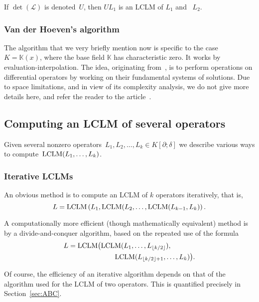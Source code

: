 \documentclass{sig-alt-full}
\def\K {\ensuremath{\mathbb{K}}}
\newcommand{\pa} { \partial}
\newcommand{\lclm} { {\rm LCLM}}
\begin{document}
\noindent If $\det(\mathcal{L})$ is denoted~$U$, then  $UL_1$ is an LCLM of $L_1$ and ~$L_2$.

\subsubsection{Van der Hoeven's algorithm}
The algorithm that we very briefly mention now is specific to the case $K =
\K(x)$, where the base field $\K$ has characteristic zero. It works by evaluation-interpolation. The idea, originating
from~\cite{Bostan03}, is to perform operations on differential operators by
working on their fundamental systems of solutions. Due to space limitations, and in view of its complexity analysis,
we do not give more details here, and refer the reader to the
article~\cite{VdHoeven11}.

\subsection{Computing an LCLM of several operators} \label{SUBSECT:comps}
Given several nonzero operators~$L_1, L_2, \ldots, L_k \in K[\pa; \delta]$ 
we describe various ways to compute~$\lclm(L_1, \ldots, L_k)$.

\subsubsection{Iterative LCLMs}
An obvious method is to compute an LCLM of $k$ operators iteratively, that is,
\begin{equation}\label{eq:iterative}
	L = \lclm \left(L_1, \lclm(L_2, \ldots, \lclm(L_{k-1}, L_k) \right). 
\end{equation}	

A computationally more efficient (though mathematically equivalent) method is by a divide-and-conquer algorithm, based on the repeated use of the formula
\begin{equation} \label{eq:iterativeByDAC}\begin{split}
L =  \lclm \big( & \lclm(L_1, \ldots, L_{\lfloor k/2 \rfloor}), \\	
& \qquad \lclm(L_{\lfloor k/2 \rfloor + 1}, \ldots, L_k) \big).
\end{split}\end{equation}

Of course, the efficiency of an iterative algorithm depends on that of the algorithm used for the LCLM of two operators. This is quantified precisely in Section~\ref{sec:ABC}.
\end{document}
